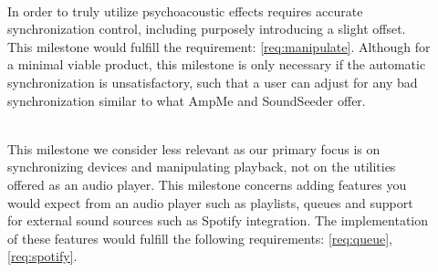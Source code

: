 \begin{description}
    \item [] \hfill \\ 
        In order to truly utilize psychoacoustic effects requires accurate synchronization control, including purposely introducing a slight offset.
        This milestone would fulfill the requirement: \ref{req:manipulate}.
        Although for a minimal viable product, this milestone is only necessary if the automatic synchronization is unsatisfactory, such that a user can adjust for any bad synchronization similar to what AmpMe and SoundSeeder offer.
    \item [] \hfill \\
        This milestone we consider less relevant as our primary focus is on synchronizing devices and manipulating playback, not on the utilities offered as an audio player.
        This milestone concerns adding features you would expect from an audio player such as playlists, queues and support for external sound sources such as Spotify integration.
        The implementation of these features would fulfill the following requirements: \ref{req:queue}, \ref{req:spotify}.
\end{description}
